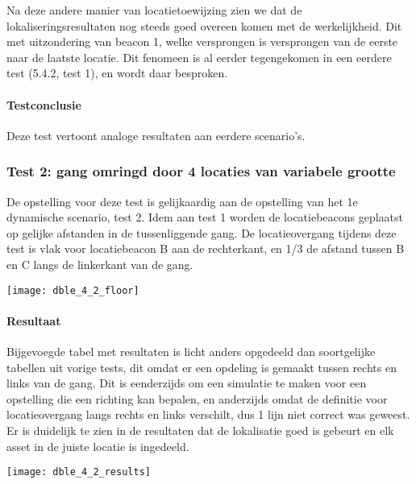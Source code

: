 Na deze andere manier van locatietoewijzing zien we dat de lokaliseringsresultaten nog steeds goed overeen komen met de werkelijkheid. Dit met uitzondering van beacon 1, welke versprongen is versprongen van de eerste naar de laatste locatie. Dit fenomeen is al eerder tegengekomen in een eerdere test (5.4.2, test 1), en wordt daar besproken.

\paragraph{Testconclusie}
Deze test vertoont analoge resultaten aan eerdere scenario's.

\subsubsection{Test 2: gang omringd door 4 locaties van variabele grootte}
\begin{minipage}{0.55\textwidth}
De opstelling voor deze test is gelijkaardig aan de opstelling van het 1e dynamische scenario, test 2. Idem aan test 1 worden de locatiebeacons geplaatst op gelijke afstanden in de tussenliggende gang. De locatieovergang tijdens deze test is vlak voor locatiebeacon B aan de rechterkant, en 1/3 de afstand tussen B en C langs de linkerkant van de gang.
\end{minipage}
\hfill
\begin{minipage}{0.42\textwidth}
	\texttt{[image: dble\_4\_2\_floor]}
	\label{fig:ond-ble-dynamic-4-2-ops}
\end{minipage}

\paragraph{Resultaat}
\begin{minipage}{0.42\textwidth}
Bijgevoegde tabel met resultaten is licht anders opgedeeld dan soortgelijke tabellen uit vorige tests, dit omdat er een opdeling is gemaakt tussen rechts en links van de gang. Dit is eenderzijds om een simulatie te maken voor een opstelling die een richting kan bepalen, en anderzijds omdat de definitie voor locatieovergang langs rechts en links verschilt, dus 1 lijn niet correct was geweest.
Er is duidelijk te zien in de resultaten dat de lokalisatie goed is gebeurt en elk asset in de juiste locatie is ingedeeld.
\end{minipage}
\hfill
\begin{minipage}{0.55\textwidth}
	\texttt{[image: dble\_4\_2\_results]}
	\label{fig:ond-ble-dynamic-4-2-res}
\end{minipage}

